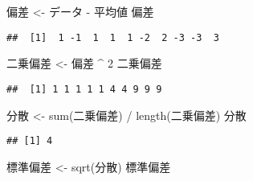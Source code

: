 \documentclass[
  12pt,
]{book}
\newenvironment{Shaded}{\begin{snugshade}}{\end{snugshade}}
\newcommand{\AttributeTok}[1]{\textcolor[rgb]{0.77,0.63,0.00}{#1}}
\newcommand{\DecValTok}[1]{\textcolor[rgb]{0.00,0.00,0.81}{#1}}
\newcommand{\FunctionTok}[1]{\textcolor[rgb]{0.00,0.00,0.00}{#1}}
\newcommand{\NormalTok}[1]{#1}
\newcommand{\OtherTok}[1]{\textcolor[rgb]{0.56,0.35,0.01}{#1}}
\newcommand{\SpecialCharTok}[1]{\textcolor[rgb]{0.00,0.00,0.00}{#1}}
\newcommand{\StringTok}[1]{\textcolor[rgb]{0.31,0.60,0.02}{#1}}
\begin{document}
\begin{Shaded}
\begin{Highlighting}[]
\StringTok{\textasciigrave{}}\AttributeTok{偏差}\StringTok{\textasciigrave{}} \OtherTok{\textless{}{-}} \StringTok{\textasciigrave{}}\AttributeTok{データ}\StringTok{\textasciigrave{}} \SpecialCharTok{{-}} \StringTok{\textasciigrave{}}\AttributeTok{平均値}\StringTok{\textasciigrave{}}
\StringTok{\textasciigrave{}}\AttributeTok{偏差}\StringTok{\textasciigrave{}}
\end{Highlighting}
\end{Shaded}

\begin{verbatim}
##  [1]  1 -1  1  1  1 -2  2 -3 -3  3
\end{verbatim}

\begin{Shaded}
\begin{Highlighting}[]
\StringTok{\textasciigrave{}}\AttributeTok{二乗偏差}\StringTok{\textasciigrave{}} \OtherTok{\textless{}{-}} \StringTok{\textasciigrave{}}\AttributeTok{偏差}\StringTok{\textasciigrave{}} \SpecialCharTok{\^{}} \DecValTok{2}
\StringTok{\textasciigrave{}}\AttributeTok{二乗偏差}\StringTok{\textasciigrave{}}
\end{Highlighting}
\end{Shaded}

\begin{verbatim}
##  [1] 1 1 1 1 1 4 4 9 9 9
\end{verbatim}

\begin{Shaded}
\begin{Highlighting}[]
\StringTok{\textasciigrave{}}\AttributeTok{分散}\StringTok{\textasciigrave{}} \OtherTok{\textless{}{-}} \FunctionTok{sum}\NormalTok{(}\StringTok{\textasciigrave{}}\AttributeTok{二乗偏差}\StringTok{\textasciigrave{}}\NormalTok{) }\SpecialCharTok{/} \FunctionTok{length}\NormalTok{(}\StringTok{\textasciigrave{}}\AttributeTok{二乗偏差}\StringTok{\textasciigrave{}}\NormalTok{)}
\StringTok{\textasciigrave{}}\AttributeTok{分散}\StringTok{\textasciigrave{}}
\end{Highlighting}
\end{Shaded}

\begin{verbatim}
## [1] 4
\end{verbatim}

\begin{Shaded}
\begin{Highlighting}[]
\StringTok{\textasciigrave{}}\AttributeTok{標準偏差}\StringTok{\textasciigrave{}} \OtherTok{\textless{}{-}} \FunctionTok{sqrt}\NormalTok{(}\StringTok{\textasciigrave{}}\AttributeTok{分散}\StringTok{\textasciigrave{}}\NormalTok{)}
\StringTok{\textasciigrave{}}\AttributeTok{標準偏差}\StringTok{\textasciigrave{}}
\end{Highlighting}
\end{Shaded}
\end{document}
